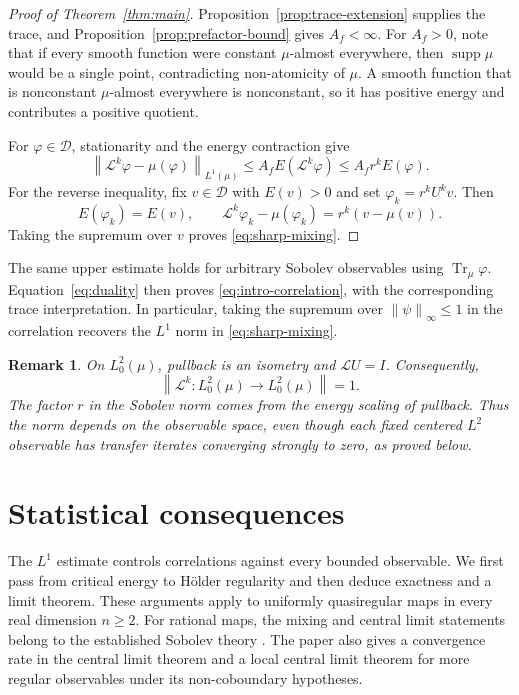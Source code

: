 \documentclass[10pt,a4paper]{amsart}
\newtheorem{remark}[theorem]{Remark}
\newcommand{\Lop}{\mathcal L}
\newcommand{\Dcal}{\mathcal D}
\newcommand{\Tr}{\operatorname{Tr}_{\mu}}
\newcommand{\norm}[1]{\left\lVert #1\right\rVert}
\DeclareMathOperator{\supp}{supp}
\numberwithin{equation}{section}
\begin{document}
\begin{proof}[Proof of Theorem~\ref{thm:main}]
Proposition~\ref{prop:trace-extension} supplies the trace, and Proposition~\ref{prop:prefactor-bound} gives $A_f<\infty$. For $A_f>0$, note that if every smooth function were constant $\mu$-almost everywhere, then $\supp\mu$ would be a single point, contradicting non-atomicity of $\mu$. A smooth function that is nonconstant $\mu$-almost everywhere is nonconstant, so it has positive energy and contributes a positive quotient.

For $\varphi\in\Dcal$, stationarity and the energy contraction give
\[
 \norm{\Lop^k\varphi-\mu(\varphi)}_{L^1(\mu)}
 \le A_fE(\Lop^k\varphi)
 \le A_fr^kE(\varphi).
\]
For the reverse inequality, fix $v\in\Dcal$ with $E(v)>0$ and set $\varphi_k=r^kU^kv$. Then
\[
 E(\varphi_k)=E(v),\qquad
 \Lop^k\varphi_k-\mu(\varphi_k)=r^k(v-\mu(v)).
\]
Taking the supremum over $v$ proves \eqref{eq:sharp-mixing}.
\end{proof}

The same upper estimate holds for arbitrary Sobolev observables using $\Tr\varphi$. Equation~\eqref{eq:duality} then proves \eqref{eq:intro-correlation}, with the corresponding trace interpretation. In particular, taking the supremum over $\norm{\psi}_\infty\le1$ in the correlation recovers the $L^1$ norm in \eqref{eq:sharp-mixing}.

\begin{remark}\label{rem:L2-no-gap}
On $L^2_0(\mu)$, pullback is an isometry and $\Lop U=I$. Consequently,
\[
 \norm{\Lop^k\colon L^2_0(\mu)\to L^2_0(\mu)}=1.
\]
The factor $r$ in the Sobolev norm comes from the energy scaling of pullback. Thus the norm depends on the observable space, even though each fixed centered $L^2$ observable has transfer iterates converging strongly to zero, as proved below.
\end{remark}

\section{Statistical consequences}\label{sec:statistics}

The $L^1$ estimate controls correlations against every bounded observable. We first pass from critical energy to H\"older regularity and then deduce exactness and a limit theorem. These arguments apply to uniformly quasiregular maps in every real dimension $n\ge2$. For rational maps, the mixing and central limit statements belong to the established Sobolev theory \cite{DNS07,DS06}. The paper \cite{DNS07} also gives a convergence rate in the central limit theorem and a local central limit theorem for more regular observables under its non-coboundary hypotheses.
\end{document}
